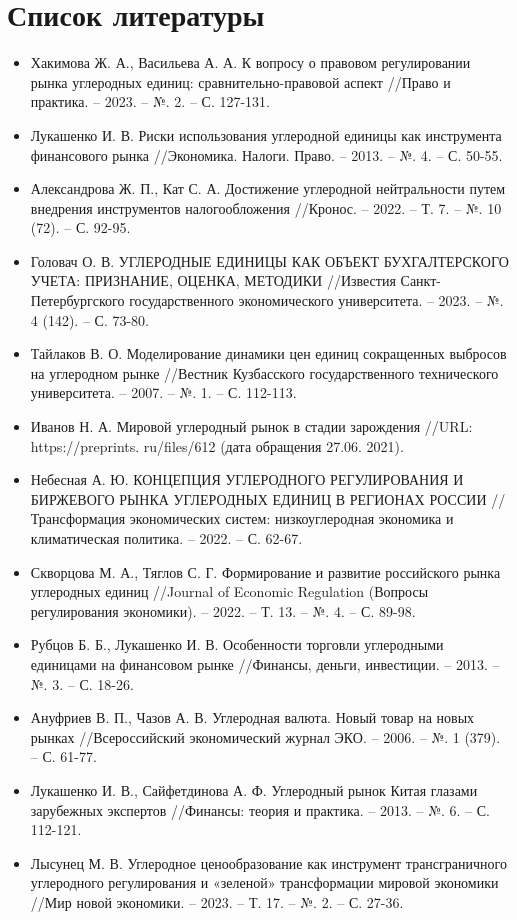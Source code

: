\documentclass[a4paper,14pt]{article}
\begin{document}
\section{Список литературы}
\begin{itemize}
    \item Хакимова Ж. А., Васильева А. А. К вопросу о правовом регулировании рынка углеродных единиц: сравнительно-правовой аспект //Право и практика. – 2023. – №. 2. – С. 127-131.
    \item Лукашенко И. В. Риски использования углеродной единицы как инструмента финансового рынка //Экономика. Налоги. Право. – 2013. – №. 4. – С. 50-55.
    \item Александрова Ж. П., Кат С. А. Достижение углеродной нейтральности путем внедрения инструментов налогообложения //Кронос. – 2022. – Т. 7. – №. 10 (72). – С. 92-95.
    \item Головач О. В. УГЛЕРОДНЫЕ ЕДИНИЦЫ КАК ОБЪЕКТ БУХГАЛТЕРСКОГО УЧЕТА: ПРИЗНАНИЕ, ОЦЕНКА, МЕТОДИКИ //Известия Санкт-Петербургского государственного экономического университета. – 2023. – №. 4 (142). – С. 73-80.
    \item Тайлаков В. О. Моделирование динамики цен единиц сокращенных выбросов на углеродном рынке //Вестник Кузбасского государственного технического университета. – 2007. – №. 1. – С. 112-113.
    \item Иванов Н. А. Мировой углеродный рынок в стадии зарождения //URL: https://preprints. ru/files/612 (дата обращения 27.06. 2021).
    \item Небесная А. Ю. КОНЦЕПЦИЯ УГЛЕРОДНОГО РЕГУЛИРОВАНИЯ И БИРЖЕВОГО РЫНКА УГЛЕРОДНЫХ ЕДИНИЦ В РЕГИОНАХ РОССИИ //Трансформация экономических систем: низкоуглеродная экономика и климатическая политика. – 2022. – С. 62-67.
    \item Скворцова М. А., Тяглов С. Г. Формирование и развитие российского рынка углеродных единиц //Journal of Economic Regulation (Вопросы регулирования экономики). – 2022. – Т. 13. – №. 4. – С. 89-98.
    \item Рубцов Б. Б., Лукашенко И. В. Особенности торговли углеродными единицами на финансовом рынке //Финансы, деньги, инвестиции. – 2013. – №. 3. – С. 18-26.
    \item Ануфриев В. П., Чазов А. В. Углеродная валюта. Новый товар на новых рынках //Всероссийский экономический журнал ЭКО. – 2006. – №. 1 (379). – С. 61-77.
    \item Лукашенко И. В., Сайфетдинова А. Ф. Углеродный рынок Китая глазами зарубежных экспертов //Финансы: теория и практика. – 2013. – №. 6. – С. 112-121.
    \item Лысунец М. В. Углеродное ценообразование как инструмент трансграничного углеродного регулирования и «зеленой» трансформации мировой экономики //Мир новой экономики. – 2023. – Т. 17. – №. 2. – С. 27-36.
\end{itemize}
\end{document}
